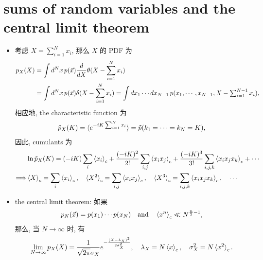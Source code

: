 \section{sums of random variables and the central limit theorem}
\begin{itemize}
	\item 考虑 $X = \sum_{i = 1}^N x_i$, 那么 $X$ 的 PDF 为
	\begin{align}
		p_X(X) &= \int d^N x \, p(\vec{x}) \frac{d}{dX} \theta(X - \sum_{i = 1}^N x_i) \notag \\
		&= \int d^N x \, p(\vec{x}) \delta(X - \sum_{i = 1}^N x_i) = \int dx_1 \cdots dx_{N - 1} \, p(x_1, \cdots, x_{N - 1}, X - {\textstyle\sum_{i = 1}^{N - 1} x_i}),
	\end{align}
	相应地, the characteristic function 为
	\begin{equation}
		\tilde{p}_X(K) = \braket{e^{- i K \sum_{i = 1}^N x_i}} = \tilde{p}(k_1 = \cdots = k_N = K),
	\end{equation}
	因此, cumulants 为
	\begin{align}
		& \ln \tilde{p}_X(K) = (- i K) \sum_i \braket{x_i}_c + \frac{(- i K)^2}{2!} \sum_{i, j} \braket{x_i x_j}_c + \frac{(- i K)^3}{3!} \sum_{i, j, k} \braket{x_i x_j x_k}_c + \cdots \notag \\
		\Longrightarrow & \braket{X}_c = \sum_i \braket{x_i}_c, \quad \braket{X^2}_c = \sum_{i, j} \braket{x_i x_j}_c, \quad \braket{X^3}_c = \sum_{i, j, k} \braket{x_i x_j x_k}_c, \quad \cdots
	\end{align}
	
	\item the central limit theorem: 如果
	\begin{equation}
		p_N(\vec{x}) = p(x_1) \cdots p(x_N) \quad \text{and} \quad \braket{x^n}_c \ll N^{\frac{n}{2} - 1},
	\end{equation}
	那么, 当 $N \rightarrow \infty$ 时, 有
	\begin{equation}
		\lim_{N \rightarrow \infty} p_X(X) = \frac{1}{\sqrt{2 \pi} \sigma_X} e^{- \frac{(X - \lambda_X)^2}{2 \sigma_X^2}}, \quad \lambda_X = N \braket{x}_c, \quad \sigma_X^2 = N \braket{x^2}_c.
	\end{equation}
	

\end{itemize}
